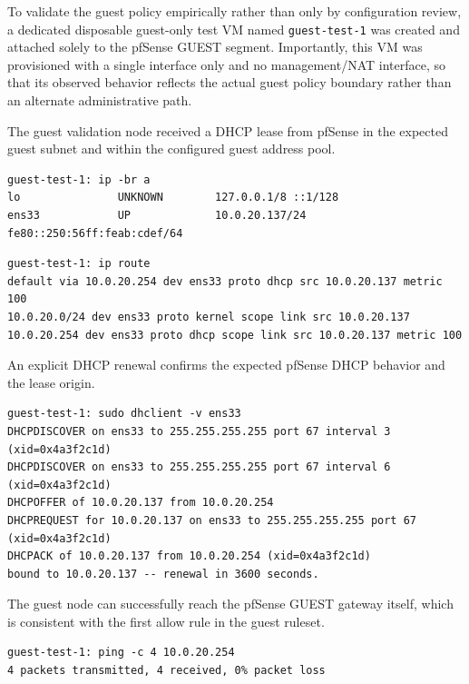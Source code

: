 \documentclass[11pt]{article}
\begin{document}
To validate the guest policy empirically rather than only by configuration review, a dedicated disposable guest-only test VM named \texttt{guest-test-1} was created and attached solely to the pfSense GUEST segment. Importantly, this VM was provisioned with a single interface only and no management/NAT interface, so that its observed behavior reflects the actual guest policy boundary rather than an alternate administrative path.

The guest validation node received a DHCP lease from pfSense in the expected guest subnet and within the configured guest address pool.

\begin{verbatim}
guest-test-1: ip -br a
lo               UNKNOWN        127.0.0.1/8 ::1/128
ens33            UP             10.0.20.137/24 fe80::250:56ff:feab:cdef/64
\end{verbatim}

\begin{verbatim}
guest-test-1: ip route
default via 10.0.20.254 dev ens33 proto dhcp src 10.0.20.137 metric 100
10.0.20.0/24 dev ens33 proto kernel scope link src 10.0.20.137
10.0.20.254 dev ens33 proto dhcp scope link src 10.0.20.137 metric 100
\end{verbatim}

An explicit DHCP renewal confirms the expected pfSense DHCP behavior and the lease origin.


\begin{verbatim}
guest-test-1: sudo dhclient -v ens33
DHCPDISCOVER on ens33 to 255.255.255.255 port 67 interval 3 (xid=0x4a3f2c1d)
DHCPDISCOVER on ens33 to 255.255.255.255 port 67 interval 6 (xid=0x4a3f2c1d)
DHCPOFFER of 10.0.20.137 from 10.0.20.254
DHCPREQUEST for 10.0.20.137 on ens33 to 255.255.255.255 port 67 (xid=0x4a3f2c1d)
DHCPACK of 10.0.20.137 from 10.0.20.254 (xid=0x4a3f2c1d)
bound to 10.0.20.137 -- renewal in 3600 seconds.
\end{verbatim}

The guest node can successfully reach the pfSense GUEST gateway itself, which is consistent with the first allow rule in the guest ruleset.

\begin{verbatim}
guest-test-1: ping -c 4 10.0.20.254
4 packets transmitted, 4 received, 0% packet loss
\end{verbatim}
\end{document}
